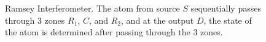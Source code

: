 \begin{figure}
\centering



\caption{Ramsey Interferometer. The atom from source $S$ sequentially
  passes through 3 zones $R_1$, $C$, and $R_2$, and at the output $D$, the
  state of the atom is determined after passing through the 3 zones.}
\label{figPart1RamsiInterferometer}
\end{figure}